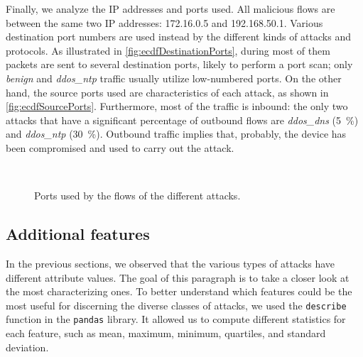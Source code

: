 \documentclass[acmlarge,nonacm]{acmart}
\begin{document}
Finally, we analyze the IP addresses and ports used. All malicious flows are between the same two IP addresses: 172.16.0.5 and 192.168.50.1. Various destination port numbers are used instead by the different kinds of attacks and protocols. As illustrated in \cref{fig:ecdfDestinationPorts}, during most of them packets are sent to several destination ports, likely to perform a port scan; only \emph{benign} and \emph{ddos\_ntp} traffic usually utilize low-numbered ports. On the other hand, the source ports used are characteristics of each attack, as shown in \cref{fig:ecdfSourcePorts}. Furthermore, most of the traffic is inbound: the only two attacks that have a significant percentage of outbound flows are \emph{ddos\_dns} (\SI{5}{\percent}) and \emph{ddos\_ntp} (\SI{30}{\percent}). Outbound traffic implies that, probably, the device has been compromised and used to carry out the attack.

\begin{figure}
	\centering
     \quad
	 \\
  	\caption{Ports used by the flows of the different attacks.} 
\end{figure}

\subsection{Additional features} \label{sec:newFeatures}
In the previous sections, we observed that the various types of attacks have different attribute values. The goal of this paragraph is to take a closer look at the most characterizing ones. To better understand which features could be the most useful for discerning the diverse classes of attacks, we used the \verb|describe| function in the \verb|pandas| library. It allowed us to compute different statistics for each feature, such as mean, maximum, minimum, quartiles, and standard deviation. 
\end{document}
